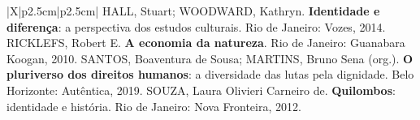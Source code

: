 \begin{xltabular}{\linewidth}{|X|p{2.5cm}|p{2.5cm}|}
{HALL, Stuart; WOODWARD, Kathryn. \textbf{Identidade e diferença}: a perspectiva dos estudos culturais. Rio de Janeiro: Vozes, 2014. \newline
{} \newline
{} \newline
{} \newline
RICKLEFS, Robert E. \textbf{A economia da natureza}. Rio de Janeiro: Guanabara Koogan, 2010. \newline
SANTOS, Boaventura de Sousa; MARTINS, Bruno Sena (org.). \textbf{O pluriverso dos direitos humanos}: a diversidade das lutas pela dignidade. Belo Horizonte: Autêntica, 2019. \newline
SOUZA, Laura Olivieri Carneiro de. \textbf{Quilombos}: identidade e história. Rio de Janeiro: Nova Fronteira, 2012. \newline
{}
} \\ \hline
\end{xltabular}

